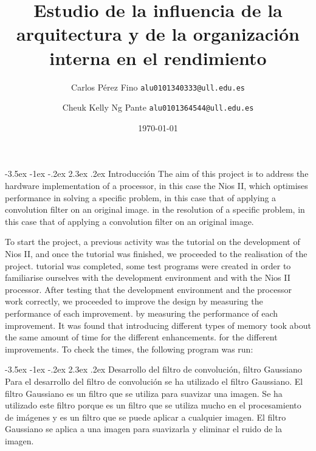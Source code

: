 \documentclass[11pt]{report}
\makeatletter
\newcommand{\subtitle}[1]{
  \posttitle{
    \par\end{center}
    \begin{center}\large#1\end{center}
    \vskip0.5em}
}
\renewcommand\chapter{\@startsection{chapter}{0}{\z@}%
    {-3.5ex \@plus -1ex \@minus -.2ex}%
    {2.3ex \@plus.2ex}%
    {\normalfont\Large\bfseries}}
\makeatother
\begin{document}
\title{Estudio de la influencia de la arquitectura y de la organización interna en el rendimiento}
\subtitle{Diseño de Procesadores}
\author{Carlos Pérez Fino \texttt{alu0101340333@ull.edu.es} \and Cheuk Kelly Ng Pante \texttt{alu0101364544@ull.edu.es}}
\date{\today}

\maketitle

\pagestyle{empty} %

\tableofcontents

\cleardoublepage

\pagestyle{plain} %
\setcounter{page}{1} %

\chapter{Introducción}
The aim of this project is to address the hardware implementation of a processor, in this case the Nios II, which optimises performance in solving a specific problem, in this case that of applying a convolution filter on an original image.
in the resolution of a specific problem, in this case that of applying a convolution filter on an original image.

To start the project, a previous activity was the tutorial on the development of Nios II, and once the tutorial was finished, we proceeded to the realisation of the project. 
tutorial was completed, some test programs were created in order to familiarise ourselves with the development environment and with the
Nios II processor. After testing that the development environment and the processor work correctly, we proceeded to improve the design by measuring the performance of each improvement.
by measuring the performance of each improvement. It was found that introducing different types of memory took about the same amount of time for the different enhancements.
for the different improvements. To check the times, the following program was run:

\lstset{style=mystyle}


\chapter{Desarrollo del filtro de convolución, filtro Gaussiano}
Para el desarrollo del filtro de convolución se ha utilizado el filtro Gaussiano. El filtro Gaussiano es un filtro que se utiliza para
suavizar una imagen. Se ha utilizado este filtro porque es un filtro que se utiliza mucho en el procesamiento de imágenes y es un filtro
que se puede aplicar a cualquier imagen. El filtro Gaussiano se aplica a una imagen para suavizarla y eliminar el ruido de la imagen.
\end{document}
